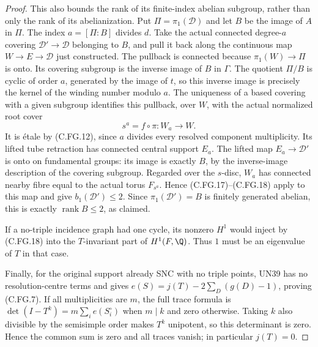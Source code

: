 \begin{proof}
This also bounds the rank of its finite-index abelian subgroup,
rather than only the rank of its abelianization. Put
$\Pi=\pi_1(\mathcal D)$ and let $B$ be the image of $A$ in $\Pi$.
The index $a=[\Pi:B]$ divides $d$. Take the actual connected
degree-$a$ covering $\mathcal D'\to\mathcal D$ belonging to $B$,
and pull it back along the continuous map
$W\to E\to\mathcal D$ just constructed. The pullback is connected
because $\pi_1(W)\to\Pi$ is onto. Its covering subgroup is the
inverse image of $B$ in $\Gamma$. The quotient $\Pi/B$ is cyclic
of order $a$, generated by the image of $t$, so this inverse
image is precisely the kernel of the winding number modulo $a$.
The uniqueness of a based covering with a given subgroup
identifies this pullback, over $W$, with the actual normalized
root cover
\[
                  s^a=f\circ\pi:W_a\longrightarrow W. \tag{C.FG.19}
\]
It is \'{e}tale by (C.FG.12), since $a$ divides every resolved
component multiplicity. Its lifted tube retraction has connected
central support $E_a$. The lifted map
$E_a\to\mathcal D'$ is onto on fundamental groups: its image is
exactly $B$, by the inverse-image description of the covering
subgroup. Regarded over the $s$-disc, $W_a$ has connected nearby
fibre equal to the actual torus $F_{s^a}$. Hence (C.FG.17)--(C.FG.18)
apply to this map and give $b_1(\mathcal D')\le2$. Since
$\pi_1(\mathcal D')=B$ is finitely generated abelian, this is
exactly $\operatorname{rank}B\le2$, as claimed.

If a no-triple incidence graph had one cycle, its nonzero
$H^1$ would inject by (C.FG.18) into the $T$-invariant part of
$H^1(F,\Q)$. Thus $1$ must be an eigenvalue of $T$ in that case.

Finally, for the original support already SNC with no triple
points, UN39 has no resolution-centre terms and gives
$e(S)=j(T)-2\sum_D(g(D)-1)$, proving (C.FG.7).
If all multiplicities are $m$, the full trace formula is
$\det(I-T^k)=m\sum_i e(S_i^\circ)$ when $m\mid k$ and zero
otherwise. Taking $k$ also divisible by the semisimple order makes
$T^k$ unipotent, so this determinant is zero. Hence the common
sum is zero and all traces vanish; in particular $j(T)=0$.
\end{proof}
